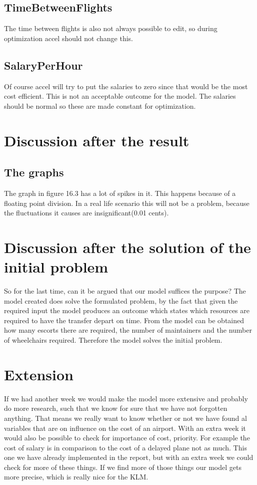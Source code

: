 \documentclass[a4paper, 11pt, notitlepage]{report}
\begin{document}
	\section{TimeBetweenFlights}
The time between flights is also not always possible to edit, so during optimization accel should not change this.
	
	\section{SalaryPerHour}
Of course accel will try to put the salaries to zero since that would be the most cost efficient. This is not an acceptable outcome for the model. The salaries should be normal so these are made constant for optimization.

\chapter{Discussion after the result}

	\section{The graphs}
	The graph in figure 16.3 has a lot of spikes in it. This happens because of a floating point division. In a real life scenario this will not be a problem, because the fluctuations it causes are insignificant(0.01 cents).
	
\chapter{Discussion after the solution of the initial problem}
So for the last time, can it be argued that our model suffices the purpose? The model created does solve the formulated problem, by the fact that given the required input the model produces an outcome which states which resources are required to have the transfer depart on time. From the model can be obtained how many escorts there are required, the number of maintainers and the number of wheelchairs required. Therefore the model solves the initial problem.
\chapter{Extension}
If we had another week we would make the model more extensive and probably do more research, such that we know for sure that we have not forgotten anything. That means we really want to know whether or not we have found al variables that are on influence on the cost of an airport. With an extra week it would also be possible to check for importance of cost, priority. For example the cost of  salary is in comparison to the cost of a delayed plane not as much. This one we have already implemented in the report, but with an extra week we could check for more of these things. If we find more of those things our model gets more precise, which is really nice for the KLM.
\end{document}
